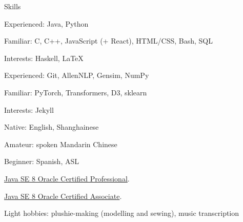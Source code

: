 
\begin{rubric}{Skills}
    \par Experienced: Java, Python
    \par Familiar: C, C++, JavaScript (+ React), HTML/CSS, Bash, SQL
    \par Interests: Haskell, \LaTeX
{}
    \par Experienced: Git, AllenNLP, Gensim, NumPy
    \par Familiar: PyTorch, Transformers, D3, sklearn
    \par Interests: Jekyll
    \par Native: English, Shanghainese
    \par Amateur: spoken Mandarin Chinese
    \par Beginner: Spanish, ASL
\entry*[Certifications]
    \par \href{https://www.youracclaim.com/badges/c3d44a4e-fabc-4abb-b4fd-2079a364f6bd/public_url}{Java SE 8 Oracle Certified Professional}.
    \par \href{https://www.youracclaim.com/badges/fead7b2a-0382-45ea-9566-fb5a39d71972/public_url}{Java SE 8 Oracle Certified Associate}.
\entry*[Misc.]
    \par Light hobbies: plushie-making (modelling and sewing), music transcription
\end{rubric}
